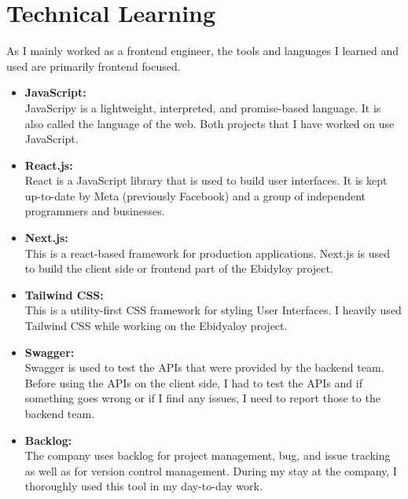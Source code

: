\setcounter{section}{0} 
\section{Technical Learning}
\begin{flushleft}
As I mainly worked as a frontend engineer, the tools and languages I learned and used are
primarily frontend focused.
\begin{itemize}
    \item \textbf{JavaScript:}\\
    \vspace{6pt}
JavaScripy is a lightweight, interpreted, and promise-based language. It is also called
the language of the web. Both projects that I have worked on use JavaScript.
\item \textbf{React.js:}\\
\vspace{6pt}
React is a JavaScript library that is used to build user interfaces. It is kept up-to-date by
Meta (previously Facebook) and a group of independent programmers and businesses.
\item \textbf{Next.js:}\\
\vspace{6pt}
This is a react-based framework for production applications. Next.js is used to build the
client side or frontend part of the Ebidyloy project.
\item \textbf{Tailwind CSS:}\\
\vspace{6pt}
This is a utility-first CSS framework for styling User Interfaces. I heavily used Tailwind
CSS while working on the Ebidyaloy project.
\item \textbf{Swagger:}\\
\vspace{6pt}
Swagger is used to test the APIs that were provided by the backend team. Before using
the APIs on the client side, I had to test the APIs and if something goes wrong or if I find
any issues, I need to report those to the backend team.
\item \textbf{Backlog:}\\
\vspace{6pt}
The company uses backlog for project management, bug, and issue tracking as well as
for version control management. During my stay at the company, I thoroughly used this
tool in my day-to-day work.
\end{itemize}



\end{flushleft}

